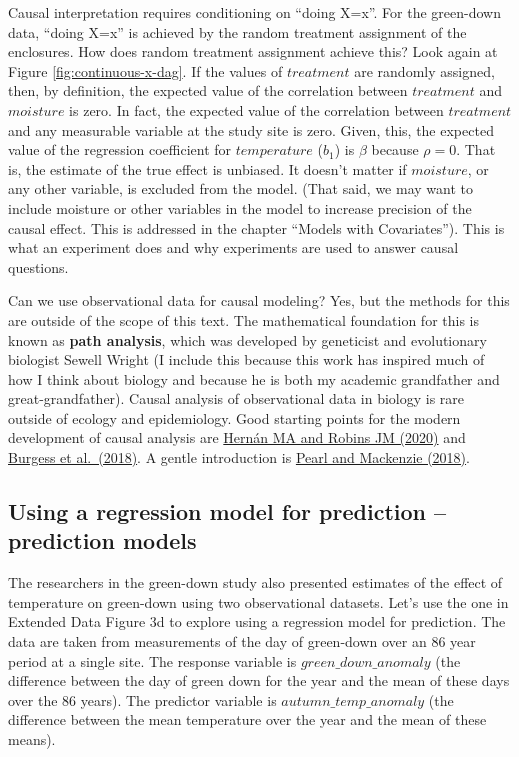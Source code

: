 \documentclass[]{book}
\begin{document}
Causal interpretation requires conditioning on ``doing X=x''. For the green-down data, ``doing X=x'' is achieved by the random treatment assignment of the enclosures. How does random treatment assignment achieve this? Look again at Figure \ref{fig:continuous-x-dag}. If the values of \(treatment\) are randomly assigned, then, by definition, the expected value of the correlation between \(treatment\) and \(moisture\) is zero. In fact, the expected value of the correlation between \(treatment\) and any measurable variable at the study site is zero. Given, this, the expected value of the regression coefficient for \(temperature\) (\(b_1\)) is \(\beta\) because \(\rho=0\). That is, the estimate of the true effect is unbiased. It doesn't matter if \(moisture\), or any other variable, is excluded from the model. (That said, we may want to include moisture or other variables in the model to increase precision of the causal effect. This is addressed in the chapter ``Models with Covariates''). This is what an experiment does and why experiments are used to answer causal questions.

Can we use observational data for causal modeling? Yes, but the methods for this are outside of the scope of this text. The mathematical foundation for this is known as \textbf{path analysis}, which was developed by geneticist and evolutionary biologist Sewell Wright (I include this because this work has inspired much of how I think about biology and because he is both my academic grandfather and great-grandfather). Causal analysis of observational data in biology is rare outside of ecology and epidemiology. Good starting points for the modern development of causal analysis are \href{https://www.hsph.harvard.edu/miguel-hernan/causal-inference-book/}{Hernán MA and Robins JM (2020)} and \href{https://www.annualreviews.org/doi/abs/10.1146/annurev-genom-083117-021731}{Burgess et al.~(2018)}. A gentle introduction is \href{https://www.basicbooks.com/titles/judea-pearl/the-book-of-why/9780465097609/}{Pearl and Mackenzie (2018)}.

\hypertarget{using-a-regression-model-for-prediction-prediction-models}{%
\subsection{Using a regression model for prediction -- prediction models}\label{using-a-regression-model-for-prediction-prediction-models}}

The researchers in the green-down study also presented estimates of the effect of temperature on green-down using two observational datasets. Let's use the one in Extended Data Figure 3d to explore using a regression model for prediction. The data are taken from measurements of the day of green-down over an 86 year period at a single site. The response variable is \(green\_down\_anomaly\) (the difference between the day of green down for the year and the mean of these days over the 86 years). The predictor variable is \(autumn\_temp\_anomaly\) (the difference between the mean temperature over the year and the mean of these means).
\end{document}
